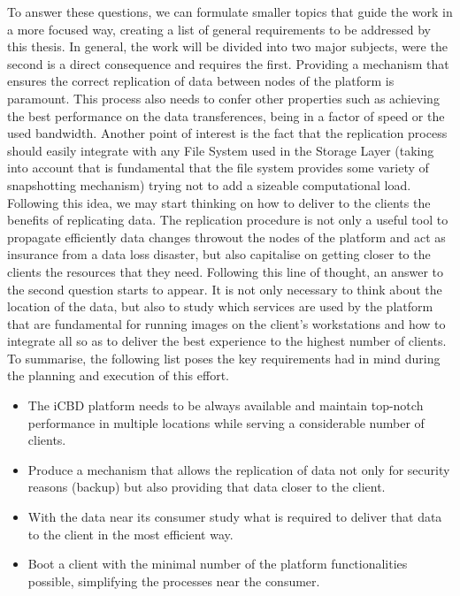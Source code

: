To answer these questions, we can formulate smaller topics that guide the work in a more focused way, creating a list of general requirements to be addressed by this thesis.
In general, the work will be divided into two major subjects, were the second is a direct consequence and requires the first. Providing a mechanism that ensures the correct replication of data between nodes of the platform is paramount. This process also needs to confer other properties such as achieving the best performance on the data transferences, being in a factor of speed or the used bandwidth. Another point of interest is the fact that the replication process should easily integrate with any File System used in the Storage Layer (taking into account that is fundamental that the file system provides some variety of snapshotting mechanism) trying not to add a sizeable computational load.
Following this idea, we may start thinking on how to deliver to the clients the benefits of replicating data. The replication procedure is not only a useful tool to propagate efficiently data changes throwout the nodes of the platform and act as insurance from a data loss disaster, but also capitalise on getting closer to the clients the resources that they need. Following this line of thought, an answer to the second question starts to appear. It is not only necessary to think about the location of the data, but also to study which services are used by the platform that are fundamental for running images on the client's workstations and how to integrate all so as to deliver the best experience to the highest number of clients.
To summarise, the following list poses the key requirements had in mind during the planning and execution of this effort.

\begin{itemize}
    \item The iCBD platform needs to be always available and maintain top-notch performance in multiple locations while serving a considerable number of clients.
    \item Produce a mechanism that allows the replication of data not only for security reasons (backup) but also providing that data closer to the client.
    \item With the data near its consumer study what is required to deliver that data to the client in the most efficient way.
	\item Boot a client with the minimal number of the platform functionalities possible, simplifying the processes near the consumer.
\end{itemize}



